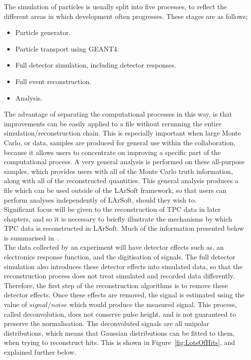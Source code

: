 The simulation of particles is usually split into five processes, to reflect the different areas in which development often progresses. These stages are as follows;
\begin{itemize}
\item Particle generator.
\item Particle transport using GEANT4.
\item Full detector simulation, including detector responses. 
\item Full event reconstruction.
\item Analysis.
\end{itemize}
The advantage of separating the computational processes in this way, is that improvements can be easily applied to a file without rerunning the entire simulation/reconstruction chain. This is especially important when large Monte Carlo, or data, samples are produced for general use within the collaboration, because it allows users to concentrate on improving a specific part of the computational process. A very general analysis is performed on these all-purpose samples, which provides users with all of the Monte Carlo truth information, along with all of the reconstructed quantities. This general analysis produces a file which can be used outside of the LArSoft framework, so that users can perform analyses independently of LArSoft, should they wish to. \\

Significant focus will be given to the reconstruction of TPC data in later chapters, and so it is necessary to briefly illustrate the mechanisms by which TPC data is reconstructed in LArSoft. Much of the information presented below is summarised in~\citep{LArSoftOrg, LArSoftRecoNote}. \\

The data collected by an experiment will have detector effects such as, an electronics response function, and the digitisation of signals. The full detector simulation also introduces these detector effects into simulated data, so that the reconstruction process does not treat simulated and recorded data differently. Therefore, the first step of the reconstruction algorithms is to remove these detector effects. Once these effects are removed, the signal is estimated using the value of $signal/noise$ which would produce the measured signal. This process, called deconvolution, does not conserve pulse height, and is not guaranteed to preserve the normalisation. The deconvoluted signals are all unipolar distributions, which means that Gaussian distributions can be fitted to them, when trying to reconstruct hits. This is shown in Figure~\ref{fig:LotsOfHits}, and explained further below.\\

